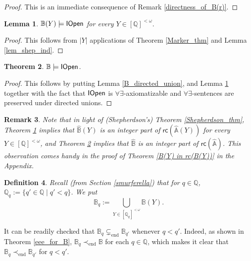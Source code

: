 \documentclass{amsart}
\newcommand{\qee} {\hspace*{2mm}\hfill \ding{109}}
\newtheorem{theorem}{Theorem}[section]
\newtheorem{define}[theorem]{Definition}
\newenvironment{definition}{\begin{define} \rm}{\qee\end{define}}
\newtheorem{lem}[theorem]{Lemma}
\newtheorem{rem}[theorem]{Remark}
\newcommand{\QS}{\mathbb{B}}
\newcommand{\fsvar}{Y}
\begin{document}
\begin{proof}This is an immediate consequence of Remark \ref{directness_of_B(r)}.
\end{proof}

\begin{lem}\label{B(r)modelsIOpen}
   $\mathbb{B}(\fsvar)\models {\sf IOpen}$ for every $\fsvar\in[\mathbb{Q}]^{<\omega}.$
\end{lem}

\begin{proof}This follows from $|\fsvar|$ applications of Theorem \ref{Marker_thm} and Lemma \ref{lem_shep_ind}.
\end{proof}

\begin{theorem}\label{B_models_IOpen}
    $\QS\models {\sf IOpen}$.
\end{theorem}

\begin{proof}This follows by putting Lemma \ref{B_directed_union}, and Lemma \ref{B(r)modelsIOpen} together with the fact that ${\sf IOpen}$ is $\forall\exists$-axiomatizable and $\forall\exists$-sentences are preserved under directed unions.
\end{proof}

\begin{rem} \label{integer_parts of_F_and_F(Y)}Note that in light of \textup(Shepherdson's\textup) 
Theorem \ref{Shepherdson_thm}, Theorem \ref{B(r)modelsIOpen} implies that $\hat{\mathbb{B}}(Y)$ is an integer part of $\mathsf{rc}(\hat{\mathbb{A}}(Y))$ for every 
$\fsvar\in[\mathbb{Q}]^{<\omega}$, and Theorem \ref{B_models_IOpen} implies that $\hat{\mathbb{B}}$ is an integer part of $\mathsf{rc}(\hat{\mathbb{A}})$. 
This observation comes handy in the proof of Theorem \ref{B(Y) in rc(B(Y))} in the Appendix.
\end{rem}

\begin{definition}Recall (from Section \ref{smurferella}) that for $q \in \mathbb{Q}$, $\mathbb{Q}_q:=\{q'\in \mathbb{Q}\mathop\mid q'<q\}$. We put
 $$\mathbb{B}_{q}:=\bigcup\limits_{\fsvar\in [\mathbb{Q}_{q}]^{<\omega}}\mathbb{B}(\fsvar).$$ 
\end{definition}

It can be readily checked that $\mathbb{B}_{q}\subsetneq_{\mathrm{end}} \mathbb{B}_{q'}$ whenever $q<q'$. Indeed, as shown in Theorem \ref{eee_for_B}, $\mathbb{B}_{q}\prec_{\mathrm{end}} \mathbb{B}$ for each $q\in \mathbb{Q}$, which makes it clear that $\mathbb{B}_{q}\prec_{\mathrm{end}} \mathbb{B}_{q'}$ for $q<q'$. 
\end{document}

